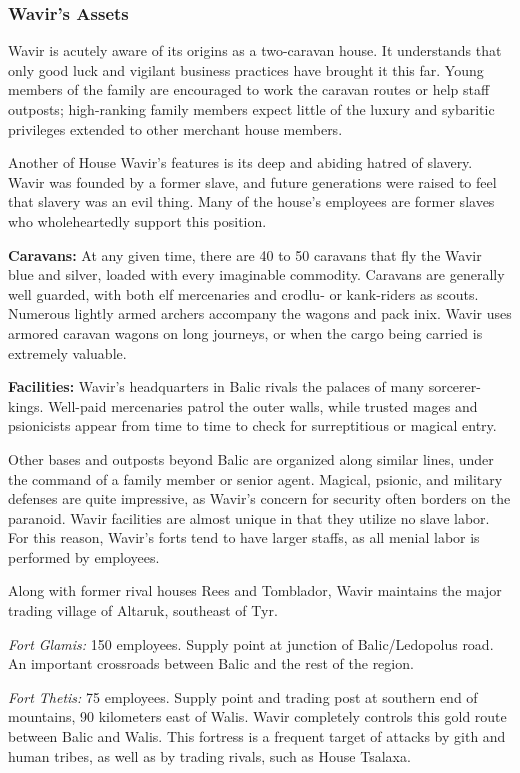 \subsubsection{Wavir's Assets}
Wavir is acutely aware of its origins as a two-caravan house. It understands that only good luck and vigilant business practices have brought it this far. Young members of the family are encouraged to work the caravan routes or help staff outposts; high-ranking family members expect little of the luxury and sybaritic privileges extended to other merchant house members.

Another of House Wavir's features is its deep and abiding hatred of slavery. Wavir was founded by a former slave, and future generations were raised to feel that slavery was an evil thing. Many of the house's employees are former slaves who wholeheartedly support this position. 

\textbf{Caravans:} At any given time, there are 40 to 50 caravans that fly the Wavir blue and silver, loaded with every imaginable commodity. Caravans are generally well guarded, with both elf mercenaries and crodlu- or kank-riders as scouts. Numerous lightly armed archers accompany the wagons and pack inix. Wavir uses armored caravan wagons on long journeys, or when the cargo being carried is extremely valuable.

\textbf{Facilities:} Wavir's headquarters in Balic rivals the palaces of many sorcerer-kings. Well-paid mercenaries patrol the outer walls, while trusted mages and psionicists appear from time to time to check for surreptitious or magical entry.

Other bases and outposts beyond Balic are organized along similar lines, under the command of a family member or senior agent. Magical, psionic, and military defenses are quite impressive, as Wavir's concern for security often borders on the paranoid. Wavir facilities are almost unique in that they utilize no slave labor. For this reason, Wavir's forts tend to have larger staffs, as all menial labor is performed by employees.

Along with former rival houses Rees and Tomblador, Wavir maintains the major trading village of Altaruk, southeast of Tyr.

\textit{Fort Glamis:} 150 employees. Supply point at junction of Balic/Ledopolus road. An important crossroads between Balic and the rest of the region.

\textit{Fort Thetis:} 75 employees. Supply point and trading post at southern end of mountains, 90 kilometers east of Walis. Wavir completely controls this gold route between Balic and Walis. This fortress is a frequent target of attacks by gith and human tribes, as well as by trading rivals, such as House Tsalaxa.

